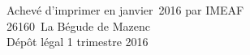 \cleardoublepage
\mbox{}
\vfill

{\scriptsize
\begin{center}
Achevé d'imprimer en janvier~2016 par IMEAF \\
26160~La Bégude de Mazenc \\[\baselineskip]

Dépôt légal\frcolon{} 1 trimestre 2016
\end{center}
}
\enlargethispage{\footskip}


